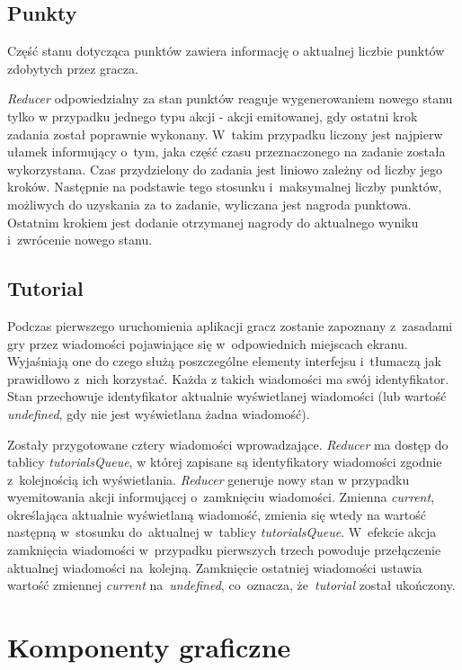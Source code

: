 \documentclass[12pt,a4paper,polish,thesis]{dcsbook}
\begin{document}
{	\subsection{Punkty}
	
	Część stanu dotycząca punktów zawiera informację o aktualnej liczbie punktów zdobytych przez gracza.
	
	\textit{Reducer} odpowiedzialny za stan punktów reaguje wygenerowaniem nowego stanu tylko w przypadku jednego typu akcji - akcji emitowanej, gdy ostatni krok zadania został poprawnie wykonany. W~takim przypadku liczony jest najpierw ułamek informujący o~tym, jaka część czasu przeznaczonego na zadanie została wykorzystana. Czas przydzielony do zadania jest liniowo zależny od liczby jego kroków. Następnie na podstawie tego stosunku i~maksymalnej liczby punktów, możliwych do uzyskania za to zadanie, wyliczana jest nagroda punktowa. Ostatnim krokiem jest dodanie otrzymanej nagrody do aktualnego wyniku i~zwrócenie nowego stanu.
	
	\subsection{Tutorial} \label{TutorialStan}
	
	Podczas pierwszego uruchomienia aplikacji gracz zostanie zapoznany z~zasadami gry przez wiadomości pojawiające się w~odpowiednich miejscach ekranu. Wyjaśniają one do czego służą poszczególne elementy interfejsu i~tłumaczą jak prawidłowo z~nich korzystać. Każda z takich wiadomości ma swój identyfikator. Stan przechowuje identyfikator aktualnie wyświetlanej wiadomości (lub wartość \textit{undefined}, gdy nie jest wyświetlana żadna wiadomość).
	
	Zostały przygotowane cztery wiadomości wprowadzające. \textit{Reducer} ma dostęp do tablicy \textit{tutorialsQueue}, w której zapisane są identyfikatory wiadomości zgodnie z~kolejnością ich wyświetlania. \textit{Reducer} generuje nowy stan w przypadku wyemitowania akcji informującej o~zamknięciu wiadomości. Zmienna \textit{current}, określająca aktualnie wyświetlaną wiadomość, zmienia się wtedy na wartość następną w~stosunku do~aktualnej w~tablicy \textit{tutorialsQueue}. W~efekcie akcja zamknięcia wiadomości w~przypadku pierwszych trzech powoduje przełączenie aktualnej wiadomości na~kolejną. Zamknięcie ostatniej wiadomości ustawia wartość zmiennej \textit{current} na~\textit{undefined}, co~oznacza, że~\textit{tutorial} został ukończony.

	\section{Komponenty graficzne}

}
\end{document}

